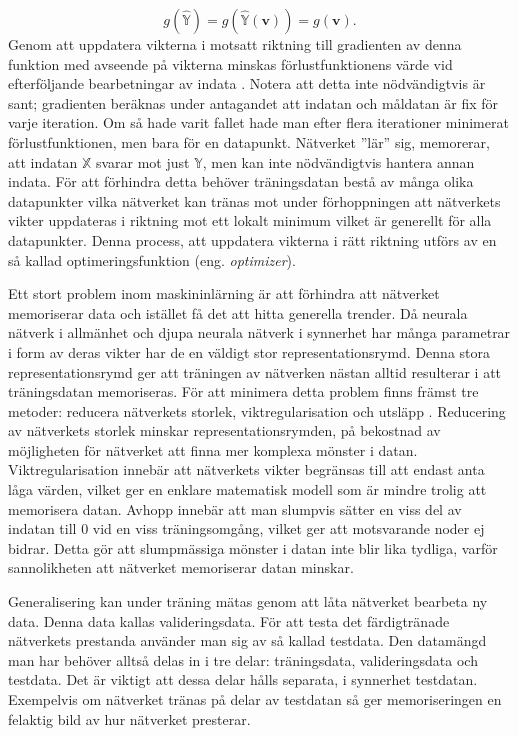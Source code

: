 \begin{equation}
    g\left(\mathbb{\hat{Y}}\right) = g\left(\mathbb{\hat{Y}}(\textbf{v})\right) = g\left(\textbf{v}\right).
\end{equation}
Genom att uppdatera vikterna i motsatt riktning till gradienten av denna funktion med avseende på vikterna minskas förlustfunktionens värde vid efterföljande bearbetningar av indata \cite{PerssonBoiers}. Notera att detta inte nödvändigtvis är sant; gradienten beräknas under antagandet att indatan och måldatan är fix för varje iteration. Om så hade varit fallet hade man efter flera iterationer minimerat förlustfunktionen, men bara för en datapunkt. Nätverket ''lär'' sig, memorerar, att indatan $\mathbb{X}$ svarar mot just $\mathbb{Y}$, men kan inte nödvändigtvis hantera annan indata. För att förhindra detta behöver träningsdatan bestå av många olika datapunkter vilka nätverket kan tränas mot under förhoppningen att nätverkets vikter uppdateras i riktning mot ett lokalt minimum vilket är generellt för alla datapunkter. Denna process, att uppdatera vikterna i rätt riktning utförs av en så kallad optimeringsfunktion (eng. \emph{optimizer}).

Ett stort problem inom maskininlärning är att förhindra att nätverket memoriserar data och istället få det att hitta generella trender. Då neurala nätverk i allmänhet och djupa neurala nätverk i synnerhet har många parametrar i form av deras vikter har de en väldigt stor representationsrymd. Denna stora representationsrymd ger att träningen av nätverken nästan alltid resulterar i att träningsdatan memoriseras. För att minimera detta problem finns främst tre metoder: reducera nätverkets storlek, viktregularisation och utsläpp \cite{Chollet}. Reducering av nätverkets storlek minskar representationsrymden, på bekostnad av möjligheten för nätverket att finna mer komplexa mönster i datan. Viktregularisation innebär att nätverkets vikter begränsas till att endast anta låga värden, vilket ger en enklare matematisk modell som är mindre trolig att memorisera datan. Avhopp innebär att man slumpvis sätter en viss del av indatan till 0 vid en viss träningsomgång, vilket ger att motsvarande noder ej bidrar. Detta gör att slumpmässiga mönster i datan inte blir lika tydliga, varför sannolikheten att nätverket memoriserar datan minskar.


Generalisering kan under träning mätas genom att låta nätverket bearbeta ny data. Denna data kallas valideringsdata. För att testa det färdigtränade nätverkets prestanda använder man sig av så kallad testdata. Den datamängd man har behöver alltså delas in i tre delar: träningsdata, valideringsdata och testdata. Det är viktigt att dessa delar hålls separata, i synnerhet testdatan. Exempelvis om nätverket tränas på delar av testdatan så ger memoriseringen en felaktig bild av hur nätverket presterar. 

